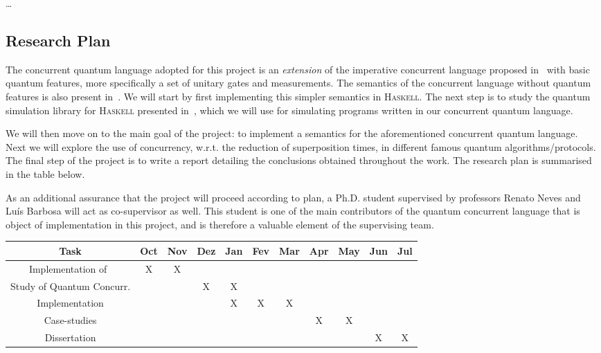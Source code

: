 \documentclass[a4paper, 11pt]{article}
\begin{document}
\dots 
\subsection*{Research Plan}

The concurrent quantum language adopted for this project is an \emph{extension}
of the imperative concurrent language proposed in~\cite{brookes96} with basic
quantum features, more specifically a set of unitary gates and measurements.
The semantics of the concurrent language without quantum features is also
present in~\cite{brookes96}. We will start by first implementing this simpler
semantics in \textsc{Haskell}.  The next step is to study the quantum
simulation library for \textsc{Haskell} presented in~\cite{altenkirch10}, which
we will use for simulating programs written in our concurrent quantum
language.

We will then move on to the main goal of the project: to implement a semantics
for the aforementioned concurrent quantum language. Next we will explore the
use of concurrency, w.r.t. the reduction of superposition times, in different
famous quantum algorithms/protocols.  The final step of the project is to write
a report detailing the conclusions obtained throughout the work. The research
plan is summarised in the table below. 

As an additional assurance that the project will proceed according to plan, a Ph.D.
student supervised by professors Renato Neves and Luís Barbosa will act as
co-supervisor as well. This student is one of the main contributors of the
quantum concurrent language that is object of implementation in this project,
and is therefore a valuable element of the supervising team. 

\begin{center}
\begin{tabular}{ | c | c | c | c | c | c | c | c | c | c | c | }
  \hline
  Task & Oct & Nov & Dez & Jan & Fev & Mar & Apr & May & Jun & Jul \\
  \hline
  Implementation of~\cite{brookes96} & X & X &  & & & & & & & \\
  \hline
  Study of Quantum Concurr.  & & & X & X  & & & & & & \\
  \hline
  Implementation & & & & X  & X & X & & & & \\
  \hline
  Case-studies & & & &  & & & X & X & & \\
  \hline
  Dissertation & & & &  & & & & & X & X \\
  \hline
\end{tabular}
\end{center}




\end{document}
